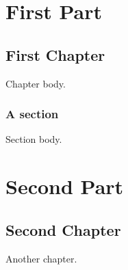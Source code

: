 \documentclass{book}
\begin{document}
\part{First Part}
\chapter{First Chapter}
Chapter body.
\section{A section}
Section body.
\part{Second Part}
\chapter{Second Chapter}
Another chapter.
\end{document}
